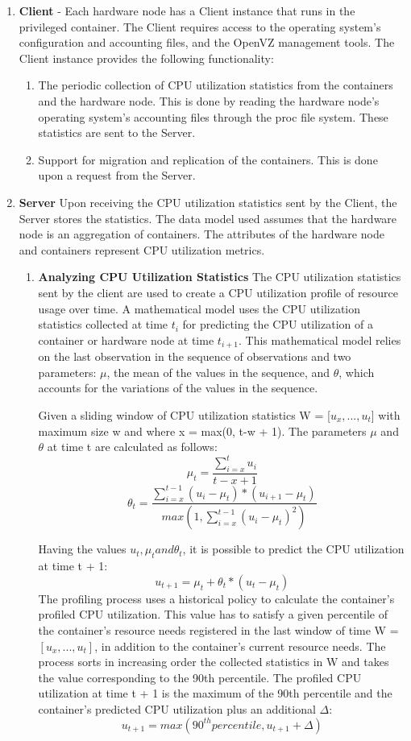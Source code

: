 \documentclass[12pt]{article} %
\begin{document}
\begin{enumerate}
\item{\textbf{Client}} - Each hardware node has a Client instance that runs in the privileged container. The Client requires access to the operating system’s configuration and accounting files, and the OpenVZ management tools. The Client instance provides
the following functionality:
\begin{enumerate}
\item{The periodic collection of CPU utilization statistics from the containers and the hardware node. This is done by reading the hardware node’s
operating system’s accounting files through the proc file system. These statistics are sent to the Server.}
\item{Support for migration and replication of the containers. This is done upon a request from the Server.}
\end{enumerate}
\item{\textbf{Server}} Upon receiving the CPU utilization statistics sent by the Client, the Server stores the statistics. The data model used assumes that the hardware node is an aggregation of containers. The attributes of the hardware node and containers represent CPU utilization metrics. 
\begin{enumerate}
\item{\textbf{Analyzing CPU Utilization Statistics}} The CPU utilization statistics sent by the client are used to create a CPU utilization profile of resource usage over time. A mathematical
model uses the CPU utilization statistics collected at time $t_i$ for predicting the CPU utilization of a container or hardware node at time $t_{i+1}$.
This mathematical model relies on the last observation in the sequence of observations and two parameters: $\mu$, the mean of the values in the sequence, and $\theta$, which accounts for the variations of the values in the sequence. 

Given a sliding window of CPU utilization statistics W = [$u_x, ..., u_t$] with maximum size w and where x = max(0, t-w + 1). The parameters $\mu$ and $\theta$ at time t are calculated as
follows:
$$\mu_t = \frac{\sum_{i=x}^{t}u_i}{t-x+1}$$
$$\theta_t = \frac{\sum_{i=x}^{t-1}(u_i -\mu_t)\ast(u_{i+1}-\mu_t)}{max(1,\sum_{i=x}^{t-1}(u_i-\mu_t)^{2})}$$

Having the values $u_t, \mu_t and \theta_t$, it is possible to predict
the CPU utilization at time t + 1:
$$u_{t+1} = \mu_t + \theta_t * (u_t - \mu_t)$$
The profiling process uses a historical policy to calculate the container’s profiled CPU utilization. This value has to satisfy a given percentile of the container’s resource needs
registered in the last window of time W = $[u_x, ..., u_t]$, in addition to the container’s current resource needs. The process sorts in increasing order the collected statistics in
W and takes the value corresponding to the 90th percentile. The profiled CPU utilization at time t + 1 is the maximum of the 90th percentile and the container’s predicted CPU utilization plus an additional $\Delta$:
$$u_{t+1} = max(90^{th}percentile, u_{t+1} + \Delta)$$


\end{enumerate}
\end{enumerate}
\end{document}
